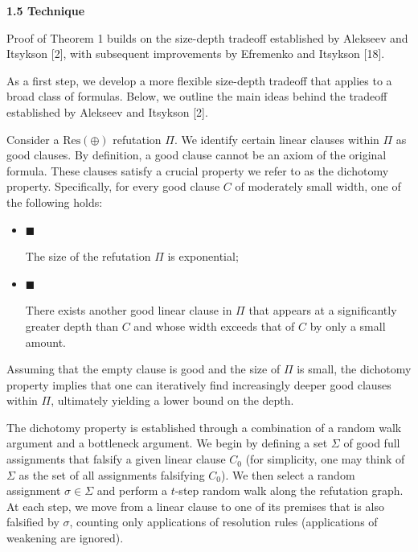 \par\medskip\noindent\textbf{
1.5 Technique}\par


Proof of Theorem 1 builds on the size-depth tradeoff established
by Alekseev and Itsykson [2], with subsequent improvements by
Efremenko and Itsykson [18].\par



As a first step, we develop a more flexible size-depth tradeoff that applies to a broad
class of formulas.
Below, we outline the main ideas behind the tradeoff established by Alekseev and
Itsykson [2].\par



Consider a $\mathrm{Res}(\oplus)$ refutation $\Pi$.
We identify certain linear clauses within $\Pi$ as good clauses.
By definition, a good clause cannot be an axiom of the original formula.
These clauses satisfy a crucial property we refer to as the dichotomy property.
Specifically, for every good clause $C$ of moderately small width, one of the following holds:\par


\begin{itemize}


\item 
$\blacksquare$ 


The size of the refutation $\Pi$ is exponential;\par





\item 
$\blacksquare$ 


There exists another good linear clause in $\Pi$ that
appears at a significantly greater depth than $C$ and whose width exceeds that of
$C$ by only a small amount.\par





\end{itemize}



Assuming that the empty clause is good and the size of $\Pi$ is small, the dichotomy property implies that one can iteratively find increasingly deeper good clauses within $\Pi$, ultimately yielding a lower bound on the depth.\par



The dichotomy property is established through a combination of a random walk argument and a bottleneck argument. We begin by defining a set $\Sigma$ of good full assignments that falsify a given linear clause $C_{0}$ (for simplicity, one may think of $\Sigma$ as the set of all assignments falsifying $C_{0}$). We then select a random assignment $\sigma\in\Sigma$ and perform a $t$-step random walk along the refutation graph. At each step, we move from a linear clause to one of its premises that is also falsified by $\sigma$, counting only applications of resolution rules (applications of weakening are ignored).\par



